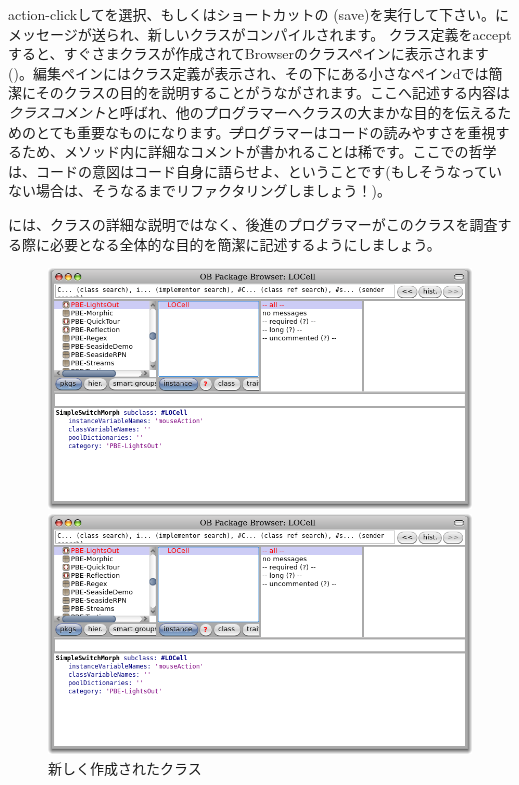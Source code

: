 \documentclass[a4paper,10pt,twoside]{book}
\begin{document}
action-clickしてを選択、もしくはショートカットの (save)を実行して下さい。にメッセージが送られ、新しいクラスがコンパイルされます。
クラス定義をacceptすると、すぐさまクラスが作成されてBrowserのクラスペインに表示されます()。編集ペインにはクラス定義が表示され、その下にある小さなペインdでは簡潔にそのクラスの目的を説明することがうながされます。ここへ記述する内容は\emph{クラスコメント}と呼ばれ、他のプログラマーへクラスの大まかな目的を伝えるためのとても重要なものになります。\st プログラマーはコードの読みやすさを重視するため、メソッド内に詳細なコメントが書かれることは稀です。ここでの哲学は、コードの意図はコード自身に語らせよ、ということです(もしそうなっていない場合は、そうなるまでリファクタリングしましょう！)。


には、クラスの詳細な説明ではなく、後進のプログラマーがこのクラスを調査する際に必要となる全体的な目的を簡潔に記述するようにしましょう。


\begin{figure}[h!t]
\ifluluelse
	{\centerline {\includegraphics[width=\textwidth]{LOCell}}}
	{\centerline {\includegraphics[scale=0.7]{LOCell}}}
\caption{新しく作成されたクラス }
\end{figure}
\end{document}
